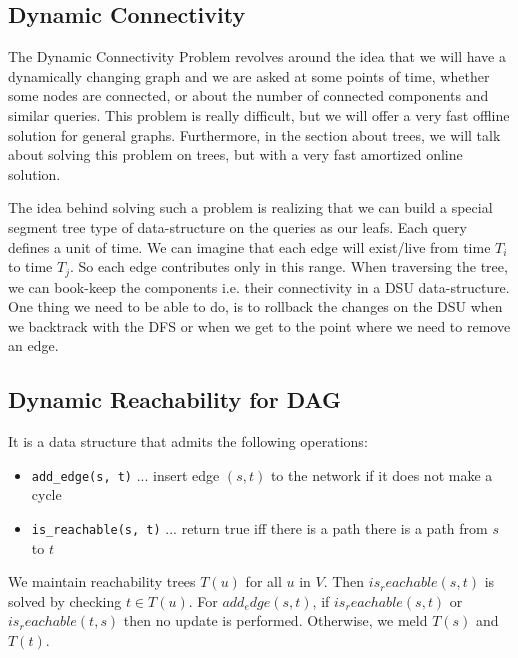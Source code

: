 \newpage

\subsection{Dynamic Connectivity}

The Dynamic Connectivity Problem \cite{CodeForces_Blog_DynamicConnectivity} revolves around the idea that we will have a dynamically changing graph and we are asked at some points of time, whether some nodes are connected, or about the number of connected components and similar queries.
This problem is really difficult, but we will offer a very fast offline solution for general graphs. Furthermore, in the section about trees, we will talk about solving this problem on trees, but with a very fast amortized online solution.

The idea behind solving such a problem is realizing that we can build a special segment tree type of data-structure on the queries as our leafs.
Each query defines a unit of time. We can imagine that each edge will exist/live from time $T_i$ to time $T_j$.
So each edge contributes only in this range. When traversing the tree, we can book-keep the components i.e. their connectivity in a DSU data-structure.
One thing we need to be able to do, is to rollback the changes on the DSU when we backtrack with the DFS or when we get to the point where we need to remove an edge.

\subsection{Dynamic Reachability for DAG}

It is a data structure that admits the following operations:
{
\begin{itemize}
  \item{\lstinline{add_edge(s, t)} ... insert edge $(s,t)$ to the network if it does not make a cycle}
  \item{\lstinline{is_reachable(s, t)} ... return true iff there is a path there is a path from $s$ to $t$}
\end{itemize}
}

We maintain reachability trees $T(u)$ for all $u$ in $V$.
Then $is_reachable(s, t)$ is solved by checking $t \in T(u)$.
For $add_edge(s, t)$, if $is_reachable(s, t)$ or $is_reachable(t, s)$ then
no update is performed. Otherwise, we meld $T(s)$ and $T(t)$.


